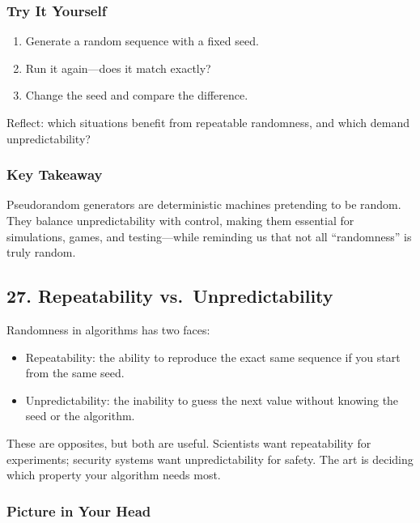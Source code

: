 \documentclass[
  letterpaper,
  DIV=11,
  numbers=noendperiod]{scrreprt}
\providecommand{\tightlist}{%
  \setlength{\itemsep}{0pt}\setlength{\parskip}{0pt}}
\begin{document}
\subsubsection{Try It Yourself}\label{try-it-yourself-25}

\begin{enumerate}
\def\labelenumi{\arabic{enumi}.}
\tightlist
\item
  Generate a random sequence with a fixed seed.
\item
  Run it again---does it match exactly?
\item
  Change the seed and compare the difference.
\end{enumerate}

Reflect: which situations benefit from repeatable randomness, and which
demand unpredictability?

\subsubsection{Key Takeaway}\label{key-takeaway-24}

Pseudorandom generators are deterministic machines pretending to be
random. They balance unpredictability with control, making them
essential for simulations, games, and testing---while reminding us that
not all ``randomness'' is truly random.

\subsection{27. Repeatability
vs.~Unpredictability}\label{repeatability-vs.-unpredictability}

Randomness in algorithms has two faces:

\begin{itemize}
\tightlist
\item
  Repeatability: the ability to reproduce the exact same sequence if you
  start from the same seed.
\item
  Unpredictability: the inability to guess the next value without
  knowing the seed or the algorithm.
\end{itemize}

These are opposites, but both are useful. Scientists want repeatability
for experiments; security systems want unpredictability for safety. The
art is deciding which property your algorithm needs most.

\subsubsection{Picture in Your Head}\label{picture-in-your-head-26}
\end{document}
